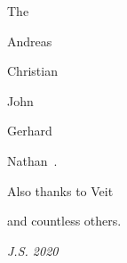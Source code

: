 \smallskip

\noindent The 

\smallskip
Andreas~

Chris\-tian~

John~

Gerhard~

Nathan~.

\medskip

Also thanks to Veit~

and countless others.

\medskip
\hfill \emph{J.S. 2020}